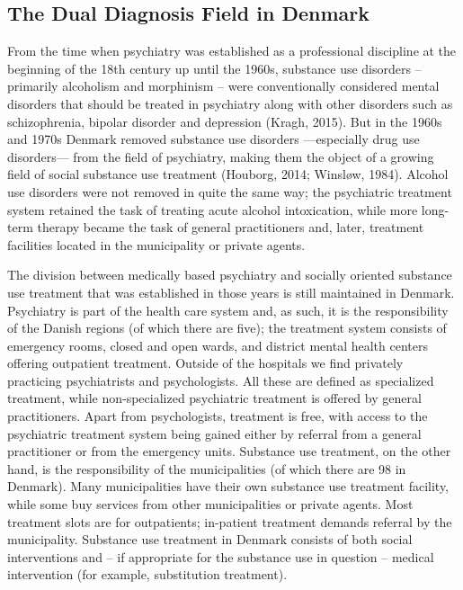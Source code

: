 \begin{multicols}{2}
\chapter{The Dual Diagnosis Field in Denmark}
From the time when psychiatry was established as a professional discipline at the beginning of the 18th century up until the 1960s, substance use disorders – primarily alcoholism and morphinism – were conventionally considered mental disorders that should be treated in psychiatry along with other disorders such as schizophrenia, bipolar disorder and depression (Kragh, 2015). But in the 1960s and 1970s Denmark removed substance use disorders –--especially drug use disorders--- from the field of psychiatry, making them the object of a growing field of social substance use treatment (Houborg, 2014; Winsløw, 1984). Alcohol use disorders were not removed in quite the same way; the psychiatric treatment system retained the task of treating acute alcohol intoxication, while more long-term therapy became the task of general practitioners and, later, treatment facilities located in the municipality or private agents.
\par
The division between medically based psychiatry and socially oriented substance use treatment that was established in those years is still maintained in Denmark. Psychiatry is part of the health care system and, as such, it is the responsibility of the Danish regions (of which there are five); the treatment system consists of emergency rooms, closed and open wards, and district mental health centers offering outpatient treatment. Outside of the hospitals we find privately practicing psychiatrists and psychologists. All these are defined as specialized treatment, while non-specialized psychiatric treatment is offered by general practitioners. Apart from psychologists, treatment is free, with access to the psychiatric treatment system being gained either by referral from a general practitioner or from the emergency units. Substance use treatment, on the other hand, is the responsibility of the municipalities (of which there are 98 in Denmark). Many municipalities have their own substance use treatment facility, while some buy services from other municipalities or private agents. Most treatment slots are for outpatients; in-patient treatment demands referral by the municipality. Substance use treatment in Denmark consists of both social interventions and – if appropriate for the substance use in question – medical intervention (for example, substitution treatment).
\par

\end{multicols}
